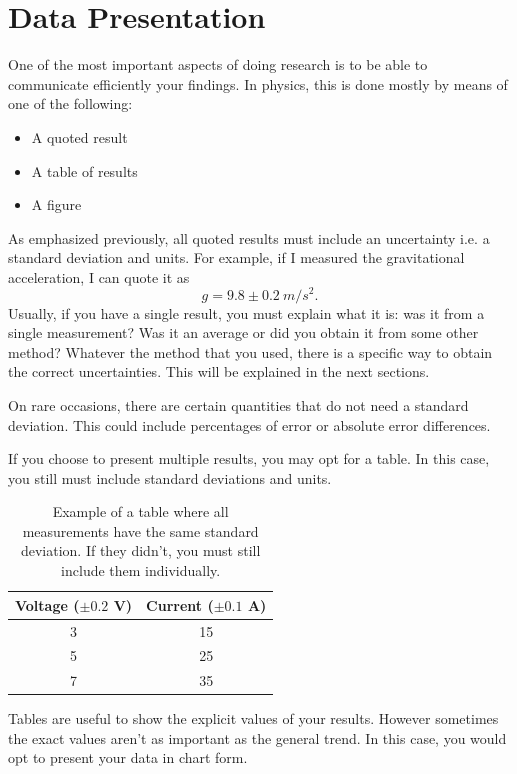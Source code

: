 \documentclass[12pt]{report}
\begin{document}
{}
\section*{Data Presentation}
One of the most important aspects of doing research is to be able to communicate efficiently your findings. In physics, this is done mostly by means of one of the following:
\begin{itemize}
\item A quoted result
\item A table of results
\item A figure
\end{itemize}

As emphasized previously, all quoted results must include an uncertainty i.e. a standard deviation and units. For example, if I measured the gravitational acceleration, I can quote it as
\begin{equation}
g = 9.8 \pm 0.2 \ m/s^2.
\end{equation}
Usually, if you have a single result, you must explain what it is: was it from a single measurement? Was it an average or did you obtain it from some other method? Whatever the method that you used, there is a specific way to obtain the correct uncertainties. This will be explained in the next sections.

On rare occasions, there are certain quantities that do not need a standard deviation. This could include percentages of error or absolute error differences.

If you choose to present multiple results, you may opt for a table. In this case, you still must include standard deviations and units.
\begin{table}[h]
\centering
\begin{tabular}{||c|c||}
\hline
Voltage ($\pm 0.2$ V) & Current ($\pm 0.1$ A) \\ \hline
3 & 15 \\
5 & 25 \\
7 & 35 \\ \hline
\end{tabular}
\caption{Example of a table where all measurements have the same standard deviation. If they didn't, you must still include them individually.}
\label{Table:Presentation-Example}
\end{table}

Tables are useful to show the explicit values of your results. However sometimes the exact values aren't as important as the general trend. In this case, you would opt to present your data in chart form.
\end{document}

